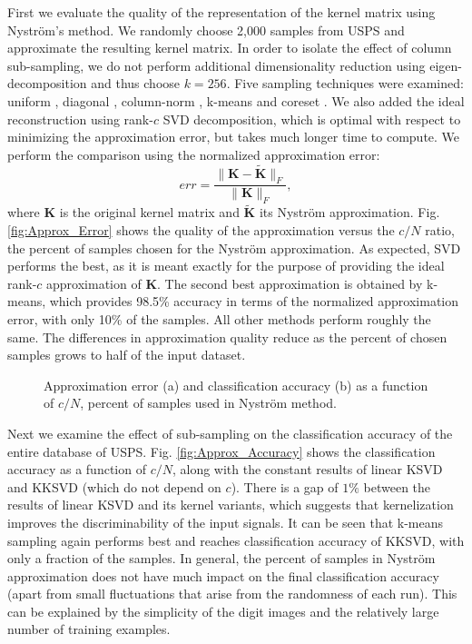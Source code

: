 \documentclass[journal]{IEEEtran}
\newcommand{\bK}{\mathbf{K}}
\begin{document}
First we evaluate the quality of the representation of the kernel matrix using Nystr\"{o}m's method. We randomly choose 2,000 samples from USPS and approximate the resulting kernel matrix. In order to isolate the effect of column sub-sampling, we do not perform additional dimensionality reduction using eigen-decomposition and thus choose $k=256$. Five sampling techniques were examined: uniform \cite{Nystrom}, diagonal \cite{DiagonalSampling}, column-norm \cite{ColumnNormSampling}, k-means \cite{KmeansSampling} and coreset \cite{coreset}. We also added the ideal reconstruction using rank-$c$ SVD decomposition, which is optimal with respect to minimizing the approximation error, but takes much longer time to compute. We perform the comparison using the normalized approximation error:
\begin{equation}\label{eq:ApproxError}
    err = \frac{\|\bK -\widetilde{\bK}\|_F}{\|\bK\|_F},
\end{equation}
where $\bK$ is the original kernel matrix and $\widetilde{\bK}$ its Nystr\"{o}m approximation. Fig. \ref{fig:Approx_Error} shows the quality of the approximation versus the $c/N$ ratio, the percent of samples chosen for the Nystr\"{o}m approximation. As expected, SVD performs the best, as it is meant exactly for the purpose of providing the ideal rank-$c$ approximation of $\bK$. The second best approximation is obtained by k-means, which provides 98.5\% accuracy in terms of the normalized approximation error, with only 10\% of the samples. All other methods perform roughly the same. The differences in approximation quality reduce as the percent of chosen samples grows to half of the input dataset.
\begin{figure*}[!t]
\centering
{}
\hfil
{}
\caption{Approximation error (a) and classification accuracy (b) as a function of $c/N$, percent of samples used in Nystr\"{o}m method.}
\label{fig:GRAPH_1}
\end{figure*}

Next we examine the effect of sub-sampling on the classification accuracy of the entire database of USPS. Fig. \ref{fig:Approx_Accuracy} shows the classification accuracy as a function of $c/N$, along with the constant results of linear KSVD and KKSVD (which do not depend on $c$). There is a gap of $1\%$ between the results of linear KSVD and its kernel variants, which suggests that kernelization improves the discriminability of the input signals. It can be seen that k-means sampling again performs best and reaches classification accuracy of KKSVD, with only a fraction of the samples. In general, the percent of samples in Nystr\"{o}m approximation does not have much impact on the final classification accuracy (apart from small fluctuations that arise from the randomness of each run). This can be explained by the simplicity of the digit images and the relatively large number of training examples.
\end{document}
